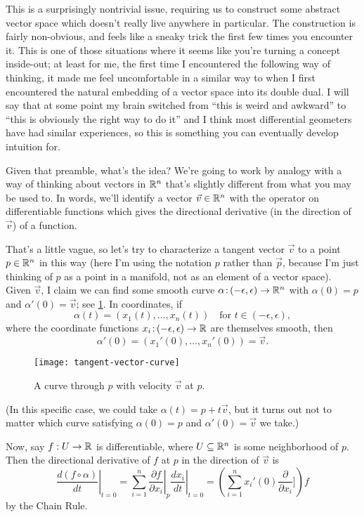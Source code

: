 This is a surprisingly nontrivial issue, requiring us to construct some abstract vector space which doesn't really live anywhere in particular. The construction is fairly non-obvious, and feels like a sneaky trick the first few times you encounter it. This is one of those situations where it seems like you're turning a concept inside-out; at least for me, the first time I encountered the following way of thinking, it made me feel uncomfortable in a similar way to when I first encountered the natural embedding of a vector space into its double dual. I will say that at some point my brain switched from ``this is weird and awkward'' to ``this is obviously the right way to do it'' and I think most differential geometers have had similar experiences, so this is something you can eventually develop intuition for.

Given that preamble, what's the idea? We're going to work by analogy with a way of thinking about vectors in $\mathbb{R}^n$ that's slightly different from what you may be used to. In words, we'll identify a vector $\vec{v} \in \mathbb{R}^n$ with the operator on differentiable functions which gives the directional derivative (in the direction of $\vec{v}$) of a function. 

That's a little vague, so let's try to characterize a tangent vector $\vec{v}$ to a point $p \in \mathbb{R}^n$ in this way (here I'm using the notation $p$ rather than $\vec{p}$, because I'm just thinking of $p$ as a point in a manifold, not as an element of a vector space). Given $\vec{v}$, I claim we can find some smooth curve $\alpha\colon\thinspace\!\! (-\epsilon, \epsilon) \to \mathbb{R}^n$ with $\alpha(0) = p$ and $\alpha'(0) = \vec{v}$; see \cref{fig:tangent vector curve}. In coordinates, if
\[
	\alpha(t) = (x_1(t), \dots , x_n(t)) \quad \text{for } t \in (-\epsilon, \epsilon),
\]
where the coordinate functions $x_i\colon\thinspace\!\! (-\epsilon,\epsilon) \to \mathbb{R}$ are themselves smooth, then
\[
	\alpha'(0) = (x_1'(0), \dots , x_n'(0)) = \vec{v}.
\]

\begin{figure}[htbp]
	\centering
		\texttt{[image: tangent-vector-curve]}
	\caption{A curve through $p$ with velocity $\vec{v}$ at $p$.}
	\label{fig:tangent vector curve}
\end{figure}

(In this specific case, we could take $\alpha(t) = p + t\vec{v}$, but it turns out not to matter which curve satisfying $\alpha(0) = p$ and $\alpha'(0) = \vec{v}$ we take.)

Now, say $f: U \to \mathbb{R}$ is differentiable, where $U \subseteq \mathbb{R}^n$ is some neighborhood of $p$. Then the directional derivative of $f$ at $p$ in the direction of $\vec{v}$ is 
\[
	\left. \frac{d(f \circ \alpha)}{dt} \right|_{t=0} = \sum_{i=1}^n \left.\frac{\partial f}{\partial x_i}\right|_p \left. \frac{d x_i}{dt} \right|_{t=0} = \left(\sum_{i=1}^n x_i'(0) \frac{\partial}{\partial x_i}]\right)f
\]
by the Chain Rule. 

